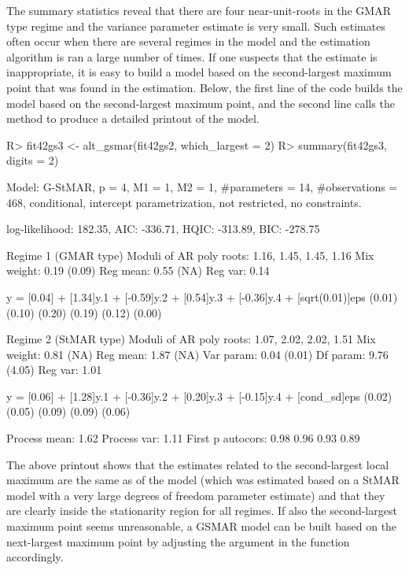 \documentclass[nojss]{jss} %
\begin{document}
%
The summary statistics reveal that there are four near-unit-roots in the GMAR type regime and the variance parameter estimate is very small. Such estimates often occur when there are several regimes in the model and the estimation algorithm is ran a large number of times. If one suspects that the estimate is inappropriate, it is easy to build a model based on the second-largest maximum point that was found in the estimation. Below, the first line of the code builds the model based on the second-largest maximum point, and the second line calls the  method to produce a detailed printout of the model.
%
\begin{CodeChunk}
\begin{CodeInput}
R> fit42gs3 <- alt_gsmar(fit42gs2, which_largest = 2)
R> summary(fit42gs3, digits = 2)
\end{CodeInput}
\begin{CodeOutput}
Model:
 G-StMAR, p = 4, M1 = 1, M2 = 1, #parameters = 14, #observations = 468,
 conditional, intercept parametrization, not restricted, no constraints.

 log-likelihood: 182.35, AIC: -336.71, HQIC: -313.89, BIC: -278.75

Regime 1 (GMAR type)
Moduli of AR poly roots: 1.16, 1.45, 1.45, 1.16
Mix weight: 0.19 (0.09)
Reg mean: 0.55 (NA)
Reg var:  0.14

y = [0.04] + [1.34]y.1 + [-0.59]y.2 + [0.54]y.3 + [-0.36]y.4 + [sqrt(0.01)]eps
    (0.01)   (0.10)       (0.20)      (0.19)       (0.12)           (0.00)

Regime 2 (StMAR type)
Moduli of AR poly roots: 1.07, 2.02, 2.02, 1.51
Mix weight: 0.81 (NA)
Reg mean: 1.87 (NA)
Var param: 0.04 (0.01)
Df param: 9.76 (4.05)
Reg var:  1.01

y = [0.06] + [1.28]y.1 + [-0.36]y.2 + [0.20]y.3 + [-0.15]y.4 + [cond_sd]eps
    (0.02)   (0.05)       (0.09)      (0.09)       (0.06)

Process mean: 1.62
Process var:  1.11
First p autocors: 0.98 0.96 0.93 0.89
\end{CodeOutput}
\end{CodeChunk}
%
The above printout shows that the estimates related to the second-largest local maximum are the same as of the model  (which was estimated based on a StMAR model with a very large degrees of freedom parameter estimate) and that they are clearly inside the stationarity region for all regimes. If also the second-largest maximum point seems unreasonable, a GSMAR model can be built based on the next-largest maximum point by adjusting the argument  in the function  accordingly.
\end{document}
